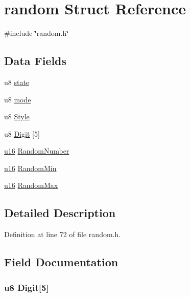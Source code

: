 \hypertarget{structrandom}{\section{random \-Struct \-Reference}
\label{structrandom}
}


{\ttfamily \#include \char`\"{}random.\-h\char`\"{}}

\subsection*{\-Data \-Fields}
\begin{DoxyCompactItemize}
\item 
u8 \hyperlink{structrandom_ad0bc4e4e6e6ffc52d9079b73afd73887}{state}
\item 
u8 \hyperlink{structrandom_a7cea6ae40aa46b41e3806213a39718c6}{mode}
\item 
u8 \hyperlink{structrandom_a0adf1bc45ebd31c75e1569a65ae60db4}{\-Style}
\item 
u8 \hyperlink{structrandom_aa3468be233ff3e0e9232d1d9dc01f632}{\-Digit} \mbox{[}5\mbox{]}
\item 
\hyperlink{main__ED__BM_8c_a9e6c91d77e24643b888dbd1a1a590054}{u16} \hyperlink{structrandom_a7f5042d7d2be5a48eb6f5d1a55367dc6}{\-Random\-Number}
\item 
\hyperlink{main__ED__BM_8c_a9e6c91d77e24643b888dbd1a1a590054}{u16} \hyperlink{structrandom_a0bdb70032c7bfe94635e1809fb1d811a}{\-Random\-Min}
\item 
\hyperlink{main__ED__BM_8c_a9e6c91d77e24643b888dbd1a1a590054}{u16} \hyperlink{structrandom_aa6e314a3cc7476d1ffabba6f5d51c16b}{\-Random\-Max}
\end{DoxyCompactItemize}


\subsection{\-Detailed \-Description}


\-Definition at line 72 of file random.\-h.



\subsection{\-Field \-Documentation}
\hypertarget{structrandom_aa3468be233ff3e0e9232d1d9dc01f632}{
\subsubsection[{\-Digit}]{\setlength{\rightskip}{0pt plus 5cm}u8 {\bf \-Digit}\mbox{[}5\mbox{]}}}\label{structrandom_aa3468be233ff3e0e9232d1d9dc01f632}



